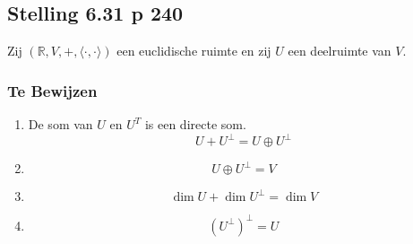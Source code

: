 \documentclass[lineaire_algebra_oplossingen.tex]{subfiles}
\begin{document}
\subsection{Stelling 6.31 p 240}
\label{6.31}
Zij $(\mathbb{R}, V,+, \langle \cdot,\cdot \rangle)$ een euclidische ruimte en zij $U$ een deelruimte van $V$.

\subsubsection*{Te Bewijzen}
\begin{enumerate}
\item De som van $U$ en $U^T$ is een directe som.
\[U + U^\bot = U \oplus U^\bot\]
\item
\[U\oplus U^\bot = V\]
\item
\[\dim U + \dim U^\bot = \dim V\]
\item
\[(U^\bot)^\bot = U\]
\end{enumerate}
\end{document}
